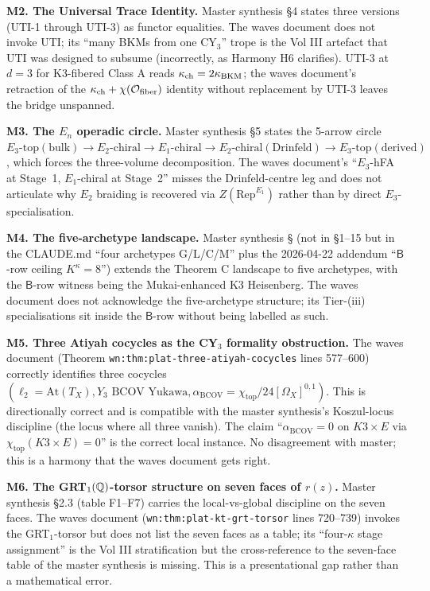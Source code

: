 \textbf{M2. The Universal Trace Identity.} Master synthesis \S4 states
three versions (UTI-1 through UTI-3) as functor equalities. The waves
document does not invoke UTI; its ``many BKMs from one CY$_3$'' trope
is the Vol III artefact that UTI was designed to subsume (incorrectly,
as Harmony H6 clarifies). UTI-3 at $d = 3$ for K3-fibered Class A
reads $\kappa_{\mathrm{ch}} = 2 \kappa_{\mathrm{BKM}}$; the waves document's retraction of the
$\kappa_{\mathrm{ch}} + \chi(\mathcal{O}_{\mathrm{fiber}})$ identity without replacement by
UTI-3 leaves the bridge unspanned.

\textbf{M3. The $E_n$ operadic circle.} Master synthesis \S5 states the
5-arrow circle $E_3\text{-top}(\text{bulk}) \to E_2\text{-chiral}
\to E_1\text{-chiral} \to E_2\text{-chiral}(\text{Drinfeld})
\to E_3\text{-top}(\text{derived})$, which forces the three-volume
decomposition. The waves document's ``$E_3$-hFA at Stage~1,
$E_1$-chiral at Stage~2'' misses the Drinfeld-centre leg and does not
articulate why $E_2$ braiding is recovered via $Z(\mathrm{Rep}^{E_1})$
rather than by direct $E_3$-specialisation.

\textbf{M4. The five-archetype landscape.} Master synthesis \S
(not in §1--15 but in the CLAUDE.md ``four archetypes G/L/C/M'' plus
the 2026-04-22 addendum ``$\mathsf{B}$-row ceiling $K^\kappa = 8$'')
extends the Theorem C landscape to five archetypes, with the
$\mathsf{B}$-row witness being the Mukai-enhanced K3 Heisenberg. The
waves document does not acknowledge the five-archetype structure; its
Tier-(iii) specialisations sit inside the $\mathsf{B}$-row without
being labelled as such.

\textbf{M5. Three Atiyah cocycles as the CY$_3$ formality obstruction.}
The waves document (Theorem \verb|wn:thm:plat-three-atiyah-cocycles|
lines 577--600) correctly identifies three cocycles
$(\ell_2 = \mathrm{At}(T_X), Y_3 \text{ BCOV Yukawa},
\alpha_{\mathrm{BCOV}} = \chi_{\mathrm{top}}/24 [\Omega_X]^{0,1})$.
This is directionally correct and is compatible with the master
synthesis's Koszul-locus discipline (the locus where all three
vanish). The claim ``$\alpha_{\mathrm{BCOV}} = 0$ on $K3 \times E$ via
$\chi_{\mathrm{top}}(K3 \times E) = 0$'' is the correct local instance.
No disagreement with master; this is a harmony that the waves document
gets right.

\textbf{M6. The GRT$_1(\mathbb{Q})$-torsor structure on seven faces of $r(z)$.}
Master synthesis §2.3 (table F1--F7) carries the local-vs-global
discipline on the seven faces. The waves document
(\verb|wn:thm:plat-kt-grt-torsor| lines 720--739) invokes the
GRT$_1$-torsor but does not list the seven faces as a table; its
``four-$\kappa$ stage assignment'' is the Vol III stratification but
the cross-reference to the seven-face table of the master synthesis
is missing. This is a presentational gap rather than a mathematical
error.


